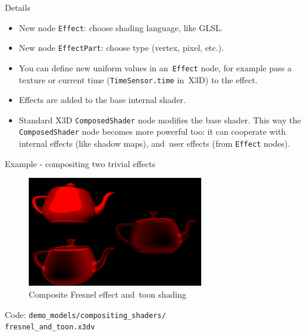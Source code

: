 \documentclass{beamer}
\begin{document}
\begin{frame}{Details}
\begin{itemize}
  \item New node \texttt{Effect}: choose shading language, like GLSL.
  \item New node \texttt{EffectPart}: choose type (vertex, pixel, etc.).
  \item You can define new uniform values in an~\texttt{Effect} node,
    for example pass a texture or current time (\texttt{TimeSensor.time} in~X3D)
    to the effect.
  \item Effects are added to the base internal shader.
  \item Standard X3D \texttt{ComposedShader} node modifies the base shader.
    This way the \texttt{ComposedShader} node becomes more powerful too:
    it can cooperate with internal effects (like shadow maps),
    and~user effects (from \texttt{Effect} nodes).
\end{itemize}
\end{frame}

\begin{frame}{Example - compositing two trivial effects}
\begin{figure}
  \centering
  \includegraphics[width=3.0in]{../fresnel_and_toon}
  \caption{Composite Fresnel effect and~toon shading}
\end{figure}

Code: \texttt{demo\_models/compositing\_shaders/\\fresnel\_and\_toon.x3dv}

\end{frame}
\end{document}

